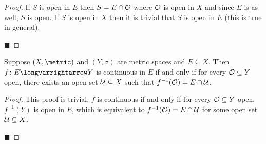 \documentclass[10pt]{article}
\def\openset{{\cal O}}
\begin{document}
\begin{proof}

    If $S$ is open in $E$ then $S=E\cap\openset$ where $\openset$ is open in $X$ and since $E$ is as well, $S$ is open.
    If $S$ is open in $X$ then it is trivial that $S$ is open in $E$ (this is true in general).

    \hfill$\blacksquare$

\end{proof}

\begin{prop*}

    Suppose $(X,\metric)$ and $(Y,\sigma)$ are metric spaces and $E\subseteq X$.
    Then $f\colon E\longvarrightarrow Y$ is continuous in $E$ if and only if for every $\openset\subseteq Y$ open, there exists an open set ${\cal U}\subseteq X$ such that $f^{-1}(\openset)=E\cap{\cal U}$.

\end{prop*}

\begin{proof}

    This proof is trivial.
    $f$ is continuous if and only if for every $\openset\subseteq Y$ open, $f^{-1}(Y)$ is open in $E$, which is equivalent to $f^{-1}(\openset)=E\cap{\cal U}$ for some open set ${\cal U}\subseteq X$.

    \hfill$\blacksquare$

\end{proof}
\end{document}

